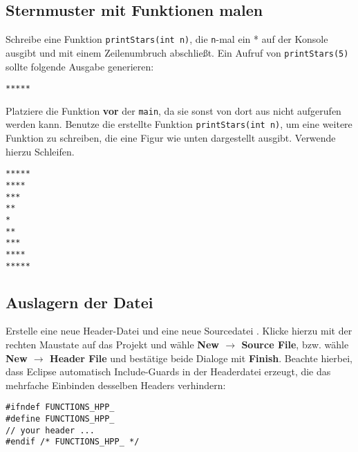 \subsection{Sternmuster mit Funktionen malen}

Schreibe eine Funktion \lstinline{printStars(int n)}, die \lstinline{n}-mal ein * auf der Konsole ausgibt und mit einem Zeilenumbruch abschließt.
Ein Aufruf von \lstinline{printStars(5)} sollte folgende Ausgabe generieren:

\begin{lstlisting}
*****
\end{lstlisting}

Platziere die Funktion \textbf{vor} der \lstinline{main}, da sie sonst von dort aus nicht aufgerufen werden kann.
Benutze die erstellte Funktion \lstinline{printStars(int n)}, um eine weitere Funktion zu schreiben, die eine Figur wie unten dargestellt ausgibt.
Verwende hierzu Schleifen.

\begin{lstlisting}
*****
****
***
**
*
**
***
****
*****
\end{lstlisting}


\subsection{Auslagern der Datei}
Erstelle eine neue Header-Datei  und eine neue
Sourcedatei .
Klicke hierzu mit der rechten Maustate auf das Projekt und wähle \textbf{New $\rightarrow$ Source File}, bzw. wähle \textbf{New $\rightarrow$ Header File} und bestätige beide Dialoge mit \textbf{Finish}.
Beachte hierbei, dass Eclipse automatisch Include-Guards in der Headerdatei erzeugt, die das mehrfache Einbinden desselben Headers verhindern:

\begin{lstlisting}
#ifndef FUNCTIONS_HPP_
#define FUNCTIONS_HPP_
// your header ...
#endif /* FUNCTIONS_HPP_ */
\end{lstlisting}

